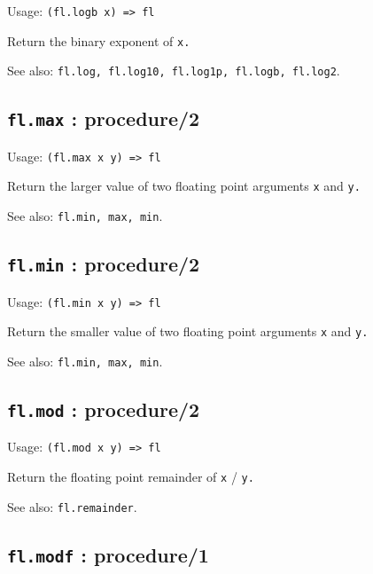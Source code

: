 \documentclass[
]{article}
\newcommand{\passthrough}[1]{#1}
\begin{document}
Usage: \passthrough{\lstinline!(fl.logb x) => fl!}

Return the binary exponent of \passthrough{\lstinline!x.!}

See also:
\passthrough{\lstinline!fl.log, fl.log10, fl.log1p, fl.logb, fl.log2!}.

\hypertarget{fl.max-procedure2-1}{%
\subsection{\texorpdfstring{\texttt{fl.max} :
procedure/2}{fl.max : procedure/2}}\label{fl.max-procedure2-1}}

Usage: \passthrough{\lstinline!(fl.max x y) => fl!}

Return the larger value of two floating point arguments
\passthrough{\lstinline!x!} and \passthrough{\lstinline!y.!}

See also: \passthrough{\lstinline!fl.min, max, min!}.

\hypertarget{fl.min-procedure2-1}{%
\subsection{\texorpdfstring{\texttt{fl.min} :
procedure/2}{fl.min : procedure/2}}\label{fl.min-procedure2-1}}

Usage: \passthrough{\lstinline!(fl.min x y) => fl!}

Return the smaller value of two floating point arguments
\passthrough{\lstinline!x!} and \passthrough{\lstinline!y.!}

See also: \passthrough{\lstinline!fl.min, max, min!}.

\hypertarget{fl.mod-procedure2-1}{%
\subsection{\texorpdfstring{\texttt{fl.mod} :
procedure/2}{fl.mod : procedure/2}}\label{fl.mod-procedure2-1}}

Usage: \passthrough{\lstinline!(fl.mod x y) => fl!}

Return the floating point remainder of \passthrough{\lstinline!x!} /
\passthrough{\lstinline!y.!}

See also: \passthrough{\lstinline!fl.remainder!}.

\hypertarget{fl.modf-procedure1-1}{%
\subsection{\texorpdfstring{\texttt{fl.modf} :
procedure/1}{fl.modf : procedure/1}}\label{fl.modf-procedure1-1}}
\end{document}
